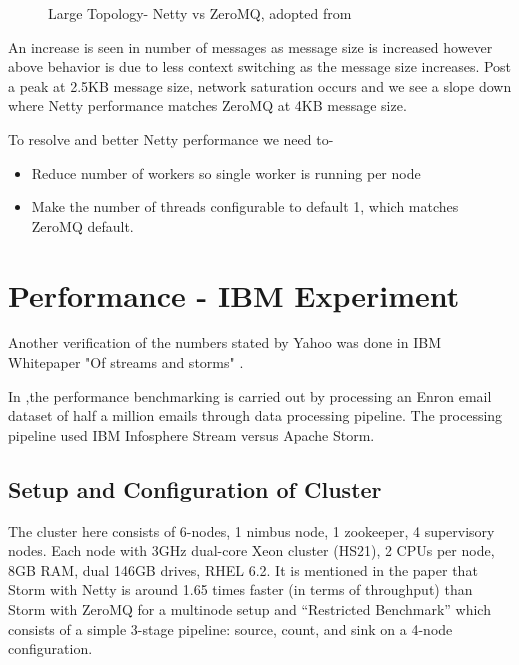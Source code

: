 \documentclass[9pt,twocolumn,twoside]{styles/osajnl}
\begin{document}
\begin{figure}[htbp]
	\centering
	\caption{Large Topology- Netty vs ZeroMQ, adopted from
          \cite{article-storm-netty}}
	\label{fig:NettyVsZMQFull}
\end{figure}

An increase is seen in number of messages as message size is increased
however above behavior is due to less context switching as the message
size increases. Post a peak at 2.5KB message size, network saturation
occurs and we see a slope down where Netty performance matches ZeroMQ
at 4KB message size.

To resolve and better Netty performance we need to-
\begin{itemize}
	\renewcommand{\labelitemi}{\scriptsize$\square$} 
	\item Reduce number of workers so single worker is running per
          node
        \item Make the number of threads configurable to default 1,
          which matches ZeroMQ default.
\end{itemize}

\section{Performance - IBM Experiment}
Another verification of the numbers stated by Yahoo was done in IBM
Whitepaper "Of streams and storms" \cite{article-nabi2014streams}.

In \cite{article-nabi2014streams},the performance benchmarking is
carried out by processing an Enron email dataset of half a million
emails through data processing pipeline. The processing pipeline used
IBM Infosphere Stream versus Apache Storm.

\subsection{Setup and Configuration of Cluster}
The cluster here consists of 6-nodes, 1 nimbus node, 1 zookeeper, 4
supervisory nodes. Each node with 3GHz dual-core Xeon cluster (HS21),
2 CPUs per node, 8GB RAM, dual 146GB drives, RHEL 6.2. It is mentioned
in the paper that Storm with Netty is around 1.65 times faster (in
terms of throughput) than Storm with ZeroMQ for a multinode setup and
“Restricted Benchmark” which consists of a simple 3-stage pipeline:
source, count, and sink on a 4-node configuration.
\end{document}
